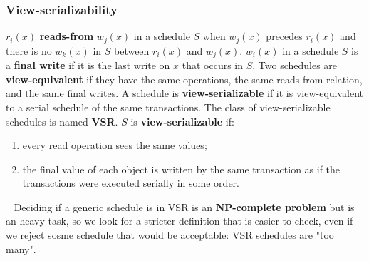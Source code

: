 \subsubsection{View-serializability}
$r_i(x)$ \textbf{reads-from} $w_j(x)$ in a schedule $S$ when $w_j(x)$ precedes $r_i(x)$ and there is no $w_k(x)$ in $S$ between $r_i(x)$ and $w_j(x)$.\newline
\newline
$w_i(x)$ in a schedule $S$ is a \textbf{final write} if it is the last write on $x$ that occurs in $S$.\newline
\newline
Two schedules are \textbf{view-equivalent} if they have the same operations, the same reads-from relation, and the same final writes.\newline
\newline
A schedule is \textbf{view-serializable} if it is view-equivalent to a serial schedule of the same transactions.\newline
The class of view-serializable schedules is named \textbf{VSR}.\newline
$S$ is \textbf{view-serializable} if:
\begin{enumerate}
    \item every read operation sees the same values;
    \item the final value of each object is written by the same transaction as if the transactions were executed serially in some order.
\end{enumerate}
\ \newline
Deciding if a generic schedule is in VSR is an \textbf{NP-complete problem} but is an heavy task, so we look for a stricter definition that is easier to check, even if we reject sosme schedule that would be acceptable: VSR schedules are "too many".
